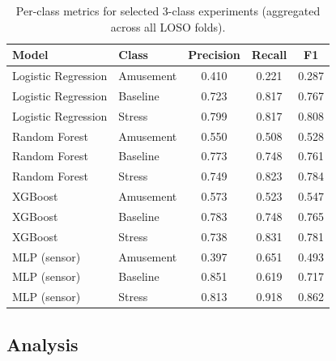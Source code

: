 \documentclass[11pt]{article}
\begin{document}
\begin{table}[H]
\centering
\caption{Per-class metrics for selected 3-class experiments (aggregated across all LOSO folds).}
\label{tab:3class-perclass}
\begin{tabular}{llccc}
\toprule
\textbf{Model} & \textbf{Class} & \textbf{Precision} & \textbf{Recall} & \textbf{F1} \\
\midrule
Logistic Regression & Amusement & 0.410 & 0.221 & 0.287 \\
Logistic Regression & Baseline  & 0.723 & 0.817 & 0.767 \\
Logistic Regression & Stress    & 0.799 & 0.817 & 0.808 \\
\midrule
Random Forest & Amusement & 0.550 & 0.508 & 0.528 \\
Random Forest & Baseline  & 0.773 & 0.748 & 0.761 \\
Random Forest & Stress    & 0.749 & 0.823 & 0.784 \\
\midrule
XGBoost & Amusement & 0.573 & 0.523 & 0.547 \\
XGBoost & Baseline  & 0.783 & 0.748 & 0.765 \\
XGBoost & Stress    & 0.738 & 0.831 & 0.781 \\
\midrule
MLP (sensor) & Amusement & 0.397 & 0.651 & 0.493 \\
MLP (sensor) & Baseline  & 0.851 & 0.619 & 0.717 \\
MLP (sensor) & Stress    & 0.813 & 0.918 & 0.862 \\
\bottomrule
\end{tabular}
\end{table}

\subsection{Analysis}
\end{document}
